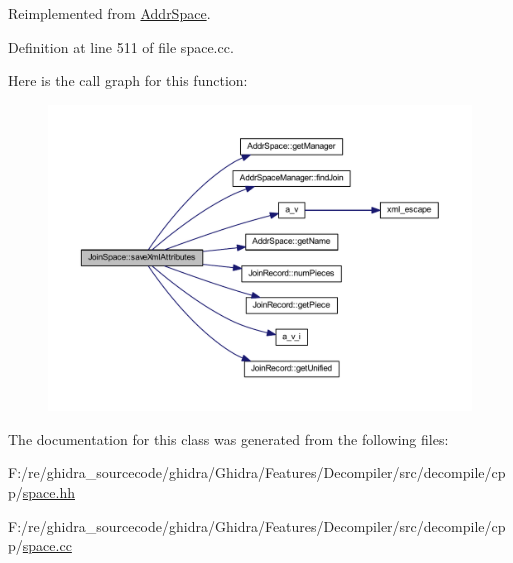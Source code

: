 Reimplemented from \mbox{\hyperlink{class_addr_space_a67510a8345fcc17157cc0389e757d504}{Addr\+Space}}.



Definition at line 511 of file space.\+cc.

Here is the call graph for this function\+:
\nopagebreak
\begin{figure}[H]
\begin{center}
\leavevmode
\includegraphics[width=350pt]{class_join_space_aa3674a311764fe483ed0a3b93a3735ca_cgraph}
\end{center}
\end{figure}


The documentation for this class was generated from the following files\+:\begin{DoxyCompactItemize}
\item 
F\+:/re/ghidra\+\_\+sourcecode/ghidra/\+Ghidra/\+Features/\+Decompiler/src/decompile/cpp/\mbox{\hyperlink{space_8hh}{space.\+hh}}\item 
F\+:/re/ghidra\+\_\+sourcecode/ghidra/\+Ghidra/\+Features/\+Decompiler/src/decompile/cpp/\mbox{\hyperlink{space_8cc}{space.\+cc}}\end{DoxyCompactItemize}
